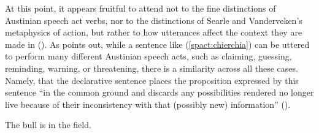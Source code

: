 At this point, it appears fruitful to attend not to the fine distinctions of Austinian speech act verbs, nor to the distinctions of Searle and Vanderveken’s metaphysics of action, but rather to how utterances affect the context they are made in (\cite{hamblin1971, stalnaker1978, lewis1979scorekeeping, gazdar1981speech}). As \textcite{chierchia1990textbook} points out, while a sentence like (\ref{spact:chierchia}) can be uttered to perform many different Austinian speech acts, such as claiming, guessing, reminding, warning, or threatening, there is a similarity across all these cases. Namely, that the declarative sentence places the proposition expressed by this sentence ``in the common ground and discards any possibilities rendered no longer live because of their inconsistency with that (possibly new) information'' (\cite[171]{ chierchia1990textbook}). 

The bull is in the field.
\eex



